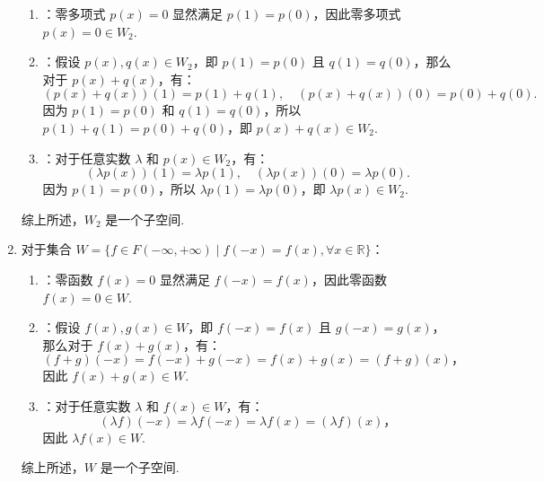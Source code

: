 \begin{exercise}
\begin{exgroup}
\begin{answer}
\begin{enumerate}
                \begin{enumerate}
                    \item {}：零多项式 $p(x) = 0$ 显然满足 $p(1) = p(0)$，因此零多项式 $p(x) = 0 \in W_2$.
                    \item {}：假设 $p(x), q(x) \in W_2$，即 $p(1) = p(0)$ 且 $q(1) = q(0)$，那么对于 $p(x) + q(x)$，有：
                    \[
                    (p(x) + q(x))(1) = p(1) + q(1), \quad (p(x) + q(x))(0) = p(0) + q(0).
                    \]
                    因为 $p(1) = p(0)$ 和 $q(1) = q(0)$，所以 $p(1) + q(1) = p(0) + q(0)$，即 $p(x) + q(x) \in W_2$.
                    \item {}：对于任意实数 $\lambda$ 和 $p(x) \in W_2$，有：
                    \[
                    (\lambda p(x))(1) = \lambda p(1), \quad (\lambda p(x))(0) = \lambda p(0).
                    \]
                    因为 $p(1) = p(0)$，所以 $\lambda p(1) = \lambda p(0)$，即 $\lambda p(x) \in W_2$.
                \end{enumerate}
                综上所述，$W_2$ 是一个子空间.

                \item 对于集合 $W = \{f \in F(-\infty, +\infty) \mid f(-x) = f(x), \forall x \in \mathbb{R}\}$：

                \begin{enumerate}
                    \item {}：零函数 $f(x) = 0$ 显然满足 $f(-x) = f(x)$，因此零函数 $f(x) = 0 \in W$.
                    \item {}：假设 $f(x), g(x) \in W$，即 $f(-x) = f(x)$ 且 $g(-x) = g(x)$，那么对于 $f(x) + g(x)$，有：
                    \[
                    (f + g)(-x) = f(-x) + g(-x) = f(x) + g(x) = (f + g)(x)，
                    \]
                    因此 $f(x) + g(x) \in W$.
                    \item {}：对于任意实数 $\lambda$ 和 $f(x) \in W$，有：
                    \[
                    (\lambda f)(-x) = \lambda f(-x) = \lambda f(x) = (\lambda f)(x)，
                    \]
                    因此 $\lambda f(x) \in W$.
                \end{enumerate}
                综上所述，$W$ 是一个子空间.

            \end{enumerate}
        \end{answer}
    \end{exgroup}


\end{exercise}
